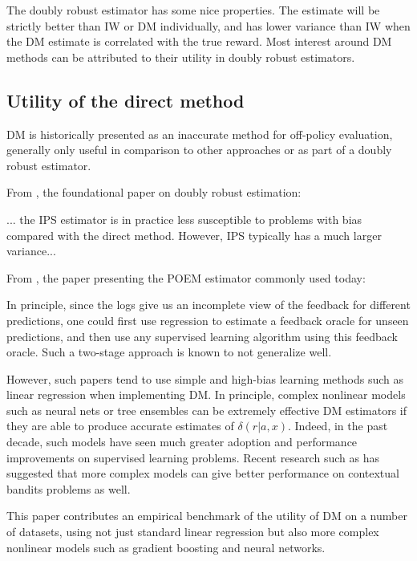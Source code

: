 \documentclass[sigplan,screen]{acmart}
\begin{document}
The doubly robust estimator has some nice properties. The estimate will be strictly better than IW or DM individually, and has lower variance than IW when the DM estimate is correlated with the true reward. Most interest around DM methods can be attributed to their utility in doubly robust estimators.

\subsection{Utility of the direct method}
DM is historically presented as an inaccurate method for off-policy evaluation, generally only useful in comparison to other approaches or as part of a doubly robust estimator.

From \cite{dudik}, the foundational paper on doubly robust estimation:

\begin{displayquote}
... the IPS estimator is in practice less susceptible to problems with bias compared with the direct method. However, IPS typically has a much larger variance...
\end{displayquote}

From \cite{poem}, the paper presenting the POEM estimator commonly used today:

\begin{displayquote}
In principle, since the logs give us an incomplete view of the feedback for different predictions, one could first use regression to estimate a feedback oracle for unseen predictions, and then use any supervised learning algorithm using this feedback oracle. Such a two-stage approach is known to not generalize well.
\end{displayquote}

However, such papers tend to use simple and high-bias learning methods such as linear regression when implementing DM. In principle, complex nonlinear models such as neural nets or tree ensembles can be extremely effective DM estimators if they are able to produce accurate estimates of $\delta(r|a,x)$. Indeed, in the past decade, such models have seen much greater adoption and performance improvements on supervised learning problems. Recent research such as \cite{overparameterize1} has suggested that more complex models can give better performance on contextual bandits problems as well.

This paper contributes an empirical benchmark of the utility of DM on a number of datasets, using not just standard linear regression but also more complex nonlinear models such as gradient boosting and neural networks. 
\end{document}
